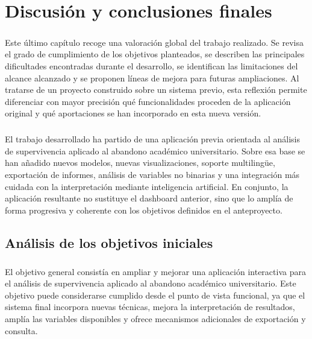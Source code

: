 \chapter{Discusión y conclusiones finales}

\paragraph*{}Este último capítulo recoge una valoración global del trabajo realizado. Se revisa el grado de cumplimiento de los objetivos planteados, se describen las principales dificultades encontradas durante el desarrollo, se identifican las limitaciones del alcance alcanzado y se proponen líneas de mejora para futuras ampliaciones. Al tratarse de un proyecto construido sobre un sistema previo, esta reflexión permite diferenciar con mayor precisión qué funcionalidades proceden de la aplicación original y qué aportaciones se han incorporado en esta nueva versión.

\paragraph*{}El trabajo desarrollado ha partido de una aplicación previa orientada al análisis de supervivencia aplicado al abandono académico universitario. Sobre esa base se han añadido nuevos modelos, nuevas visualizaciones, soporte multilingüe, exportación de informes, análisis de variables no binarias y una integración más cuidada con la interpretación mediante inteligencia artificial. En conjunto, la aplicación resultante no sustituye el dashboard anterior, sino que lo amplía de forma progresiva y coherente con los objetivos definidos en el anteproyecto.

\section{Análisis de los objetivos iniciales}

\paragraph*{}El objetivo general consistía en ampliar y mejorar una aplicación interactiva para el análisis de supervivencia aplicado al abandono académico universitario. Este objetivo puede considerarse cumplido desde el punto de vista funcional, ya que el sistema final incorpora nuevas técnicas, mejora la interpretación de resultados, amplía las variables disponibles y ofrece mecanismos adicionales de exportación y consulta.

